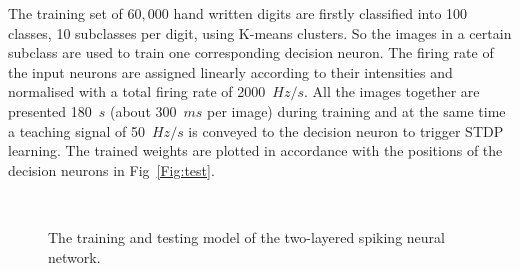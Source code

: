 The training set of $60,000$ hand written digits are firstly classified into 100 classes, 10 subclasses per digit, using K-means clusters.
So the images in a certain subclass are used to train one corresponding decision neuron.
The firing rate of the input neurons are assigned linearly according to their intensities and normalised with a total firing rate of 2000~$Hz/s$.
All the images together are presented 180~$s$ (about 300~$ms$ per image) during training and at the same time a teaching signal of 50~$Hz/s$ is conveyed to the decision neuron to trigger STDP learning.
The trained weights are plotted in accordance with the positions of the decision neurons in Fig~\ref{Fig:test}.
\begin{figure}[thb!]
	\centering
	 \\

	\centering
	
		
	\caption{The training and testing model of the two-layered spiking neural network.}
	\label{fig:model}
\end{figure} 



